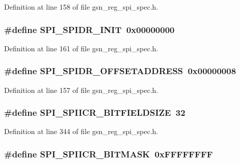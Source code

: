 Definition at line 158 of file gsn\_\-reg\_\-spi\_\-spec.h.

\hypertarget{a00573_a8322bb1b9452e342f783c0b18e0f19f9}{
\subsubsection[{SPI\_\-SPIDR\_\-INIT}]{\setlength{\rightskip}{0pt plus 5cm}\#define SPI\_\-SPIDR\_\-INIT~0x00000000}}
\label{a00573_a8322bb1b9452e342f783c0b18e0f19f9}


Definition at line 161 of file gsn\_\-reg\_\-spi\_\-spec.h.

\hypertarget{a00573_ad2c6e72df96595c66cc94c12eab6f471}{
\subsubsection[{SPI\_\-SPIDR\_\-OFFSETADDRESS}]{\setlength{\rightskip}{0pt plus 5cm}\#define SPI\_\-SPIDR\_\-OFFSETADDRESS~0x00000008}}
\label{a00573_ad2c6e72df96595c66cc94c12eab6f471}


Definition at line 157 of file gsn\_\-reg\_\-spi\_\-spec.h.

\hypertarget{a00573_af27f74f7bbce2e5b786afce1d14669e0}{
\subsubsection[{SPI\_\-SPIICR\_\-BITFIELDSIZE}]{\setlength{\rightskip}{0pt plus 5cm}\#define SPI\_\-SPIICR\_\-BITFIELDSIZE~32}}
\label{a00573_af27f74f7bbce2e5b786afce1d14669e0}


Definition at line 344 of file gsn\_\-reg\_\-spi\_\-spec.h.

\hypertarget{a00573_a7c2ace4513b174b3e4a15d14046ed8aa}{
\subsubsection[{SPI\_\-SPIICR\_\-BITMASK}]{\setlength{\rightskip}{0pt plus 5cm}\#define SPI\_\-SPIICR\_\-BITMASK~0xFFFFFFFF}}
\label{a00573_a7c2ace4513b174b3e4a15d14046ed8aa}


